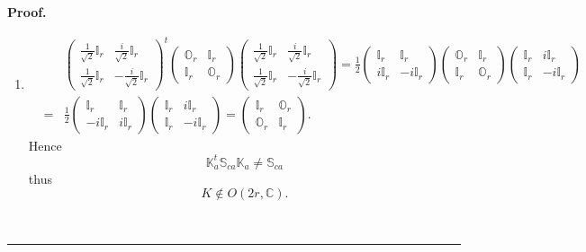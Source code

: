 \documentclass[aps, preprint]{revtex4}
\newenvironment{proof}[1][Proof]{\noindent\textbf{#1.} }{\ \rule{0.5em}{0.5em}}
\begin{document}
\begin{proof}
\begin{enumerate}
\item
\begin{align} &  & \left (\begin{array}{cc}\frac{1}{\sqrt{2}} \mathbb{I}_{r} & \frac{i}{\sqrt{2}} \mathbb{I}_{r} \\
\frac{1}{\sqrt{2}} \mathbb{I}_{r} &  -\frac{i}{\sqrt{2}} \mathbb{I}_{r}\end{array}\right )^{t} \left (\begin{array}{cc}\mathbb{O}_{r} & \mathbb{I}_{r} \\
\mathbb{I}_{r} & \mathbb{O}_{r}\end{array}\right ) \left (\begin{array}{cc}\frac{1}{\sqrt{2}} \mathbb{I}_{r} & \frac{i}{\sqrt{2}} \mathbb{I}_{r} \\
\frac{1}{\sqrt{2}} \mathbb{I}_{r} &  -\frac{i}{\sqrt{2}} \mathbb{I}_{r}\end{array}\right ) =\frac{1}{2} \left (\begin{array}{cc}\mathbb{I}_{r} & \mathbb{I}_{r} \\
i \mathbb{I}_{r} &  -i \mathbb{I}_{r}\end{array}\right ) \left (\begin{array}{cc}\mathbb{O}_{r} & \mathbb{I}_{r} \\
\mathbb{I}_{r} & \mathbb{O}_{r}\end{array}\right ) \left (\begin{array}{cc}\mathbb{I}_{r} & i \mathbb{I}_{r} \\
\mathbb{I}_{r} &  -i \mathbb{I}_{r}\end{array}\right ) \\
 &  = & \frac{1}{2} \left (\begin{array}{cc}\mathbb{I}_{r} & \mathbb{I}_{r} \\
 -i \mathbb{I}_{r} & i \mathbb{I}_{r}\end{array}\right ) \left (\begin{array}{cc}\mathbb{I}_{r} & i \mathbb{I}_{r} \\
\mathbb{I}_{r} &  -i \mathbb{I}_{r}\end{array}\right ) =\left (\begin{array}{cc}\mathbb{I}_{r} & \mathbb{O}_{r} \\
\mathbb{O}_{r} & \mathbb{I}_{r}\end{array}\right )\text{.}\end{align}Hence
\begin{equation}\mathbb{K}_{a}^{t} \mathbb{S}_{c a} \mathbb{K}_{a} \neq \mathbb{S}_{c a}
\end{equation}thus
\begin{equation}K \notin O \left (2 r ,\mathbb{C}\right )\text{.}
\end{equation}\end{enumerate}
\end{proof}
\end{document}
